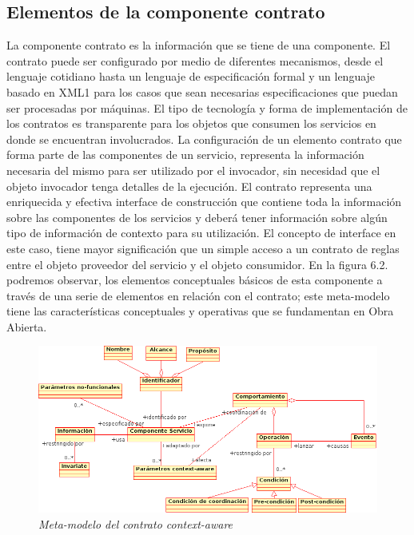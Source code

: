 \documentclass{llncs}
\begin{document}
\subsection {Elementos de la componente contrato}

La componente contrato es la información que se tiene de una componente. El contrato puede ser configurado por medio de diferentes mecanismos, desde el lenguaje cotidiano hasta un lenguaje de especificación formal y un lenguaje basado en XML1 para los casos que sean necesarias especificaciones que puedan ser procesadas por máquinas. 
El tipo de tecnología y forma de implementación de los contratos es transparente para los objetos que consumen los servicios en donde se encuentran involucrados.
La configuración de un elemento contrato que forma parte de  las componentes de un servicio, representa la información necesaria del mismo para ser utilizado por el invocador, sin necesidad que el objeto invocador tenga detalles de la ejecución.
El contrato representa una enriquecida y efectiva interface de construcción que contiene toda la información sobre las componentes de los servicios y deberá tener información sobre algún tipo de información de contexto para su utilización.
El concepto de interface en este caso, tiene mayor significación que un simple acceso a un contrato de reglas entre el objeto proveedor del servicio y el objeto consumidor.
En la figura 6.2. podremos observar, los elementos conceptuales básicos de esta componente a través de una serie de elementos en relación con el contrato; este meta-modelo tiene las características conceptuales y operativas que se fundamentan en Obra Abierta. 




\begin{figure}[!h]
\begin{center}
		\includegraphics[width=5in,totalheight=2in]{contratoca.png}
                \caption{\small \sl Meta-modelo del contrato context-aware} \label{requerimientos}
\end{center}
\end{figure}
 
\end{document}
